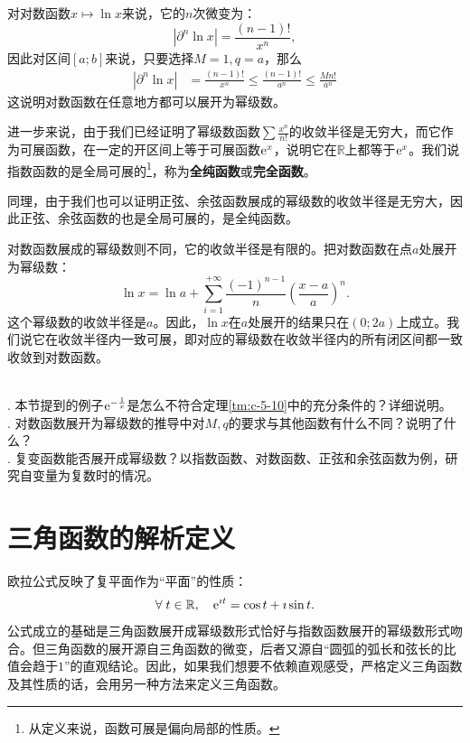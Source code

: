 \documentclass[12pt,UTF8,fontset=none]{ctexbook}
\begin{document}
\begin{appendix}
对对数函数$x\mapsto \ln{x}$来说，它的$n$次微变为：
$$ |\partial^n \ln{x}| = \frac{(n - 1)!}{x^n}, $$
因此对区间$[a;b]$来说，只要选择$M=1,q=a$，那么
\begin{align*}
    |\partial^n \ln{x}| &= \frac{(n - 1)!}{x^n} \leqslant \frac{(n - 1)!}{a^n} \leqslant \frac{M n!}{a^n}
\end{align*}
这说明对数函数在任意地方都可以展开为幂级数。

进一步来说，由于我们已经证明了幂级数函数$\sum \frac{x^n}{n!}$的收敛半径是无穷大，而它作为可展函数，在一定的开区间上等于可展函数$\mathrm{e}^x$，说明它在$\mathbb{R}$上都等于$\mathrm{e}^x$。我们说指数函数的是全局可展的\footnote{从定义来说，函数可展是偏向局部的性质。}，称为\textbf{全纯函数}或\textbf{完全函数}。

同理，由于我们也可以证明正弦、余弦函数展成的幂级数的收敛半径是无穷大，因此正弦、余弦函数的也是全局可展的，是全纯函数。

对数函数展成的幂级数则不同，它的收敛半径是有限的。把对数函数在点$a$处展开为幂级数：
$$ \ln{x} = \ln{a} + \sum_{i=1}^{+\infty} \frac{(-1)^{n-1}}{n} \left(\frac{x - a}{a}\right)^n. $$
这个幂级数的收敛半径是$a$。因此，$\ln{x}$在$a$处展开的结果只在$(0;2a)$上成立。我们说它在收敛半径内一致可展，即对应的幂级数在收敛半径内的所有闭区间都一致收敛到对数函数。

\begin{sk}
    \mbox{} \\
    . 本节提到的例子$\mathrm{e}^{-\frac{1}{x}}$是怎么不符合定理\ref{tm:c-5-10}中的充分条件的？详细说明。\\
    . 对数函数展开为幂级数的推导中对$M,q$的要求与其他函数有什么不同？说明了什么？\\
    . 复变函数能否展开成幂级数？以指数函数、对数函数、正弦和余弦函数为例，研究自变量为复数时的情况。
\end{sk}


\section{三角函数的解析定义}

欧拉公式反映了复平面作为“平面”的性质：
$$ \forall \; t\in\mathbb{R}, \quad \mathrm{e}^{\imath t} = \cos{t} + \imath \sin{t}. $$
公式成立的基础是三角函数展开成幂级数形式恰好与指数函数展开的幂级数形式吻合。但三角函数的展开源自三角函数的微变，后者又源自“圆弧的弧长和弦长的比值会趋于$1$”的直观结论。因此，如果我们想要不依赖直观感受，严格定义三角函数及其性质的话，会用另一种方法来定义三角函数。


\end{appendix}
\end{document}
